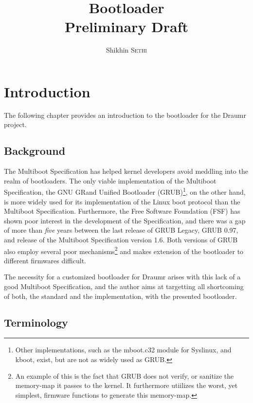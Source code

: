 \documentclass[a4paper,oneside]{memoir}
\begin{document}
\title{Bootloader\\\small Preliminary Draft}
\author{Shikhin \textsc{Sethi}}
\maketitle

\clearpage

\tableofcontents

\chapter{Introduction}

The following chapter provides an introduction to the bootloader for the Draumr project.

\section{Background}

The Multiboot Specification has helped kernel developers avoid meddling into the realm of bootloaders. The only viable implementation of the Multiboot Specification, the GNU GRand Unified Bootloader (GRUB)\footnote{Other implementations, such as the mboot.c32 module for Syslinux, and kboot, exist, but are not as widely used as GRUB.}, on the other hand, is more widely used for its implementation of the Linux boot protocol than the Multiboot Specification. Furthermore, the Free Software Foundation (FSF) has shown poor interest in the development of the Specification, and there was a gap of more than \emph{five} years between the last release of GRUB Legacy, GRUB 0.97, and release of the Multiboot Specification version 1.6. Both versions of GRUB also employ several poor mechanisms\footnote{An example of this is the fact that GRUB does not verify, or sanitize the memory-map it passes to the kernel. It furthermore utiilizes the worst, yet simplest, firmware functions to generate this memory-map.} and makes extension of the bootloader to different firmwares difficult.

The necessity for a customized bootloader for Draumr arises with this lack of a good Multiboot Specification, and the author aims at targetting all shortcoming of both, the standard and the implementation, with the presented bootloader.

\section{Terminology}
\end{document}
